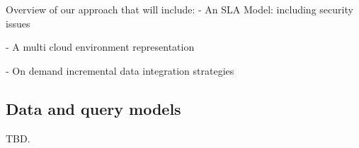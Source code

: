 {\color{green}
Overview of our approach that will include:
- An SLA Model: including security issues

- A multi cloud environment representation

- On demand incremental data integration strategies
}



\subsection{Data and query models}
\label{sec:dqm}

TBD.
